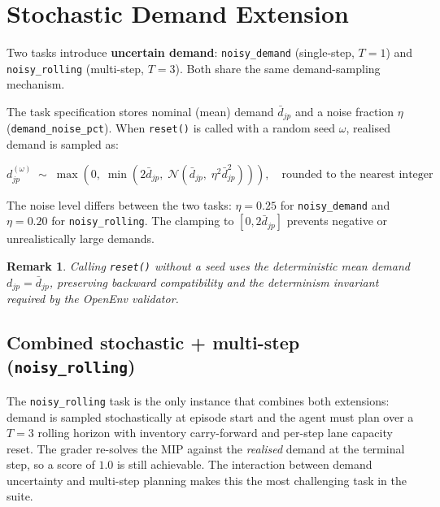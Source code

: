 \documentclass[11pt, a4paper]{article}
\newtheorem{remark}{Remark}
\begin{document}
\section{Stochastic Demand Extension}

Two tasks introduce \textbf{uncertain demand}: \texttt{noisy\_demand}
(single-step, $T=1$) and \texttt{noisy\_rolling} (multi-step, $T=3$).
Both share the same demand-sampling mechanism.

The task specification stores nominal (mean) demand $\bar{d}_{jp}$ and a
noise fraction $\eta$ (\texttt{demand\_noise\_pct}).  When
\texttt{reset()} is called with a random seed $\omega$, realised demand
is sampled as:

\begin{equation}
  d_{jp}^{(\omega)}
  \;\sim\;
  \max\!\left(0,\;
    \min\!\left(
      2\bar{d}_{jp},\;
      \mathcal{N}\!\left(\bar{d}_{jp},\; \eta^2 \bar{d}_{jp}^2\right)
    \right)
  \right), \quad \text{rounded to the nearest integer}
  \label{eq:stochastic-demand}
\end{equation}

The noise level differs between the two tasks: $\eta = 0.25$ for
\texttt{noisy\_demand} and $\eta = 0.20$ for \texttt{noisy\_rolling}.
The clamping to $[0, 2\bar{d}_{jp}]$ prevents negative or unrealistically
large demands.

\begin{remark}
  Calling \texttt{reset()} without a seed uses the deterministic mean
  demand $d_{jp} = \bar{d}_{jp}$, preserving backward compatibility and
  the determinism invariant required by the OpenEnv validator.
\end{remark}

\subsection{Combined stochastic + multi-step (\texttt{noisy\_rolling})}

The \texttt{noisy\_rolling} task is the only instance that combines both
extensions: demand is sampled stochastically at episode start and the
agent must plan over a $T=3$ rolling horizon with inventory carry-forward
and per-step lane capacity reset.  The grader re-solves the MIP against
the \emph{realised} demand at the terminal step, so a score of $1.0$ is
still achievable.  The interaction between demand uncertainty and
multi-step planning makes this the most challenging task in the suite.
\end{document}
